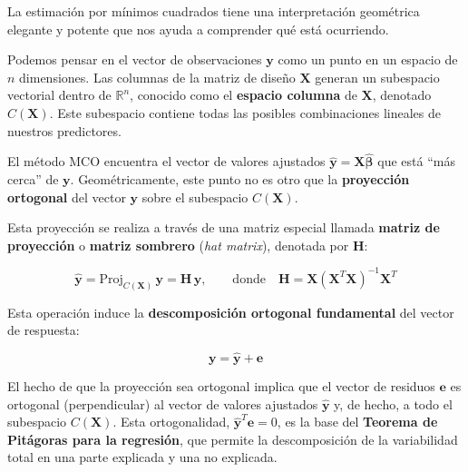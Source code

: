 \documentclass[
  letterpaper,
  DIV=11,
  numbers=noendperiod]{scrreprt}
\begin{document}
\begin{tcolorbox}[enhanced jigsaw, breakable, toprule=.15mm, bottomtitle=1mm, coltitle=black, colbacktitle=quarto-callout-note-color!10!white, titlerule=0mm, opacitybacktitle=0.6, bottomrule=.15mm, toptitle=1mm, title=\textcolor{quarto-callout-note-color}{\faInfo}\hspace{0.5em}{La perspectiva geométrica de mínimos cuadrados}, arc=.35mm, rightrule=.15mm, opacityback=0, colframe=quarto-callout-note-color-frame, leftrule=.75mm, left=2mm, colback=white]

La estimación por mínimos cuadrados tiene una interpretación geométrica
elegante y potente que nos ayuda a comprender qué está ocurriendo.

Podemos pensar en el vector de observaciones \(\mathbf{y}\) como un
punto en un espacio de \(n\) dimensiones. Las columnas de la matriz de
diseño \(\mathbf{X}\) generan un subespacio vectorial dentro de
\(\mathbb{R}^n\), conocido como el \textbf{espacio columna} de
\(\mathbf{X}\), denotado \(C(\mathbf{X})\). Este subespacio contiene
todas las posibles combinaciones lineales de nuestros predictores.

El método MCO encuentra el vector de valores ajustados
\(\hat{\mathbf{y}} = \mathbf{X}\hat{\boldsymbol{\beta}}\) que está ``más
cerca'' de \(\mathbf{y}\). Geométricamente, este punto no es otro que la
\textbf{proyección ortogonal} del vector \(\mathbf{y}\) sobre el
subespacio \(C(\mathbf{X})\).

Esta proyección se realiza a través de una matriz especial llamada
\textbf{matriz de proyección} o \textbf{matriz sombrero} (\emph{hat
matrix}), denotada por \(\mathbf{H}\):

\[\hat{\mathbf{y}} = \text{Proj}_{C(\mathbf{X})}\,\mathbf{y} = \mathbf{H}\,\mathbf{y}, \qquad \text{donde} \quad \mathbf{H} = \mathbf{X}(\mathbf{X}^T\mathbf{X})^{-1}\mathbf{X}^T\]

Esta operación induce la \textbf{descomposición ortogonal fundamental}
del vector de respuesta:

\[\mathbf{y} = \hat{\mathbf{y}} + \mathbf{e}\]

El hecho de que la proyección sea ortogonal implica que el vector de
residuos \(\mathbf{e}\) es ortogonal (perpendicular) al vector de
valores ajustados \(\hat{\mathbf{y}}\) y, de hecho, a todo el subespacio
\(C(\mathbf{X})\). Esta ortogonalidad,
\(\hat{\mathbf{y}}^T\mathbf{e}=0\), es la base del \textbf{Teorema de
Pitágoras para la regresión}, que permite la descomposición de la
variabilidad total en una parte explicada y una no explicada.

\end{tcolorbox}
\end{document}
